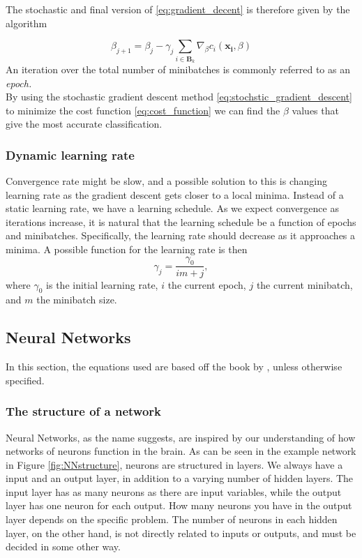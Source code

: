 The stochastic and final version of \eqref{eq:gradient_decent} is therefore given by the algorithm

\begin{equation}
    \beta_{j+1} = \beta_j - \gamma_j \sum_{i \in \boldsymbol{B}_k}\nabla_\beta c_i(\boldsymbol{x_i},\beta)
    \label{eq:stochstic_gradient_descent}
\end{equation}
An iteration over the total number of minibatches is commonly referred to as an \textit{epoch.}\\

By using the stochastic gradient descent method \eqref{eq:stochstic_gradient_descent} to minimize the cost function \eqref{eq:cost_function} we can find the $\beta$ values that give the most accurate classification.

\subsubsection*{Dynamic learning rate}
Convergence rate might be slow, and a possible solution to this is changing learning rate as
the gradient descent gets closer to a local minima. Instead of a static learning rate, we have a learning schedule. As we expect convergence as iterations increase, it is natural that the learning schedule
be a function of epochs and minibatches. Specifically, the learning rate should decrease as it approaches a minima.
A possible function for the learning rate is then
  \begin{equation}
    \label{eq:learning_schedule}
    \gamma_{j} = \frac{\gamma_0}{im+j},
  \end{equation}
where $\gamma_{0}$ is the initial learning rate, $i$ the current epoch, $j$ the current minibatch,
and $m$ the minibatch size.

\subsection{Neural Networks}
In this section, the equations used are based off the book by \cite{Nielsen}, unless otherwise specified.
\subsubsection*{The structure of a network}
Neural Networks, as the name suggests, are inspired by our understanding of how networks of neurons function in the brain. As can be seen in the example network in Figure \ref{fig:NNstructure}, neurons are structured in layers. We always have a input and an output layer, in addition to a varying number of hidden layers. The input layer has as many neurons as there are input variables, while the output layer has one neuron for each output. How many neurons you have in the output layer depends on the specific problem. The number of neurons in each hidden layer, on the other hand, is not directly related to inputs or outputs, and must be decided in some other way.

